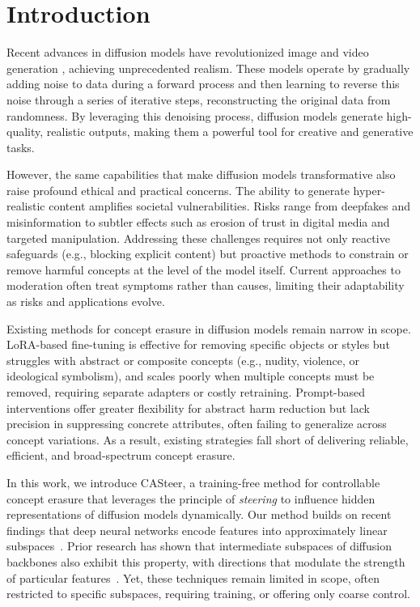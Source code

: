 
\section{Introduction}
\label{sec:intro}


Recent advances in diffusion models \cite{DBLP:conf/nips/HoJA20, DBLP:conf/cvpr/RombachBLEO22} have revolutionized image \cite{DBLP:conf/iclr/PodellELBDMPR24} and video generation \cite{emu-video}, achieving unprecedented realism.
%
These models operate by gradually adding noise to data during a forward process and then learning to reverse this noise through a series of iterative steps, reconstructing the original data from randomness.
%
By leveraging this denoising process, diffusion models generate high-quality, realistic outputs, making them a powerful tool for creative and generative tasks.

However, the same capabilities that make diffusion models transformative also raise profound ethical and practical concerns. The ability to generate hyper-realistic content amplifies societal vulnerabilities. Risks range from deepfakes and misinformation to subtler effects such as erosion of trust in digital media and targeted manipulation. Addressing these challenges requires not only reactive safeguards (e.g., blocking explicit content) but proactive methods to constrain or remove harmful concepts at the level of the model itself. Current approaches to moderation often treat symptoms rather than causes, limiting their adaptability as risks and applications evolve.

Existing methods for concept erasure in diffusion models remain narrow in scope. LoRA-based fine-tuning \cite{DBLP:conf/iclr/HuSWALWWC22} is effective for removing specific objects or styles but struggles with abstract or composite concepts (e.g., nudity, violence, or ideological symbolism), and scales poorly when multiple concepts must be removed, requiring separate adapters or costly retraining. Prompt-based interventions \cite{DBLP:journals/corr/abs-2410-12761} offer greater flexibility for abstract harm reduction but lack precision in suppressing concrete attributes, often failing to generalize across concept variations. As a result, existing strategies fall short of delivering reliable, efficient, and broad-spectrum concept erasure.


In this work, we introduce CASteer, a training-free method for controllable concept erasure that leverages the principle of \textit{steering} to influence hidden representations of diffusion models dynamically. Our method builds on recent findings that deep neural networks encode features into approximately linear subspaces~\cite{elhage2021mathematical,DBLP:conf/nips/WuGIPG23}. Prior research has shown that intermediate subspaces of diffusion backbones also exhibit this property, with directions that modulate the strength of particular features~\cite{DBLP:conf/iclr/KwonJU23, DBLP:conf/nips/ParkKCJU23, DBLP:conf/cvpr/SiH0024, DBLP:conf/cvpr/TumanyanGBD23, DBLP:conf/cvpr/0010S00G24}. Yet, these techniques remain limited in scope, often restricted to specific subspaces, requiring training, or offering only coarse control.

